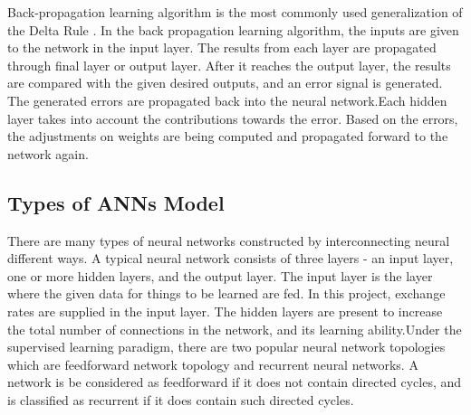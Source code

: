 Back-propagation learning algorithm is the most commonly used generalization of the Delta Rule \cite{widrow:1990}. In the back propagation learning algorithm, the inputs are given to the network  in the input layer. The results from each layer are propagated through final layer or output layer. After it reaches the output layer, the results are compared with the given desired outputs, and   an error signal is generated.
The generated errors are propagated  back into the neural network.Each hidden layer takes into account the contributions towards the error. Based on the errors, the adjustments on weights are being computed and propagated forward to the network again.


\subsection{Types of ANNs Model}

There are many types of neural networks constructed by interconnecting neural different ways. A typical neural network consists of three layers - an input layer, one or more hidden layers, and the output layer. The input layer is the layer where the given data for things to be learned are fed. In this project, exchange rates are supplied in the input layer. The hidden layers are present to increase the total number of connections in the network, and its learning ability.Under the supervised learning paradigm, there are two popular neural network topologies which are feedforward network topology and recurrent neural networks. A network is be considered  as feedforward if it does not contain directed cycles, and is classified as recurrent if it does contain such directed cycles.

